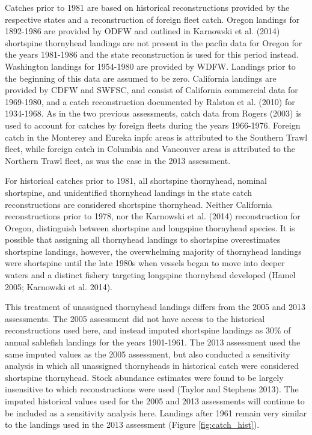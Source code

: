 \documentclass[11pt,
  english,
  letterpaper,
]{article}
\begin{document}
Catches prior to 1981 are based on historical reconstructions provided by the respective states and a reconstruction of foreign fleet catch. Oregon landings for 1892-1986 are provided by ODFW and outlined in Karnowski et al. (2014) shortspine thornyhead landings are not present in the \gls{pacfin} data for Oregon for the years 1981-1986 and the state reconstruction is used for this period instead. Washington landings for 1954-1980 are provided by WDFW. Landings prior to the beginning of this data are assumed to be zero. California landings are provided by CDFW and SWFSC, and consist of California commercial data for 1969-1980, and a catch reconstruction documented by Ralston et al. (2010) for 1934-1968. As in the two previous assessments, catch data from Rogers (2003) is used to account for catches by foreign fleets during the years 1966-1976. Foreign catch in the Monterey and Eureka \gls{inpfc} areas is attributed to the Southern Trawl fleet, while foreign catch in Columbia and Vancouver areas is attributed to the Northern Trawl fleet, as was the case in the 2013 assessment.

For historical catches prior to 1981, all shortspine thornyhead, nominal shortspine, and unidentified thornyhead landings in the state catch reconstructions are considered shortspine thornyhead. Neither California reconstructions prior to 1978, nor the Karnowski et al. (2014) reconstruction for Oregon, distinguish between shortspine and longspine thornyhead species. It is possible that assigning all thornyhead landings to shortspine overestimates shortspine landings, however, the overwhelming majority of thornyhead landings were shortspine until the late 1980s when vessels began to move into deeper waters and a distinct fishery targeting longspine thornyhead developed (Hamel 2005; Karnowski et al. 2014).

This treatment of unassigned thornyhead landings differs from the 2005 and 2013 assessments. The 2005 assessment did not have access to the historical reconstructions used here, and instead imputed shortspine landings as 30\% of annual sablefish landings for the years 1901-1961. The 2013 assessment used the same imputed values as the 2005 assessment, but also conducted a sensitivity analysis in which all unassigned thornyheads in historical catch were considered shortspine thornyhead. Stock abundance estimates were found to be largely insensitive to which reconstructions were used (Taylor and Stephens 2013). The imputed historical values used for the 2005 and 2013 assessments will continue to be included as a sensitivity analysis here. Landings after 1961 remain very similar to the landings used in the 2013 assessment (Figure \ref{fig:catch_hist}).
\end{document}
